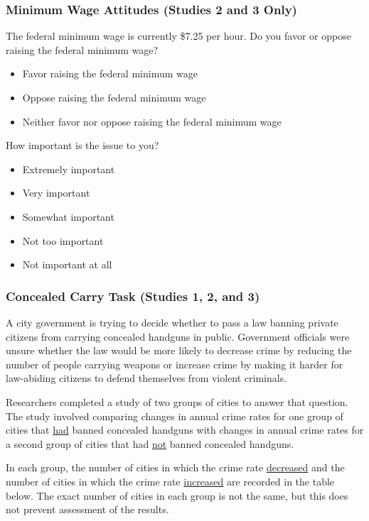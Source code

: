 \subsubsection{Minimum Wage Attitudes (Studies 2 and 3 Only)}
The federal minimum wage is currently \$7.25 per hour. Do you favor or oppose raising the federal minimum wage?
\vspace{-3mm}
\begin{itemize}
\setlength\itemsep{-.5em}
  \item Favor raising the federal minimum wage
  \item Oppose raising the federal minimum wage
  \item Neither favor nor oppose raising the federal minimum wage
\end{itemize}

How important is the issue to you?
\vspace{-3mm}
\begin{itemize}
\setlength\itemsep{-.5em}
  \item Extremely important
  \item Very important
  \item Somewhat important
  \item Not too important
  \item Not important at all
\end{itemize}


\subsubsection{Concealed Carry Task (Studies 1, 2, and 3)}
A city government is trying to decide whether to pass a law banning private citizens from carrying concealed handguns in public. Government officials were unsure whether the law would be more likely to decrease crime by reducing the number of people carrying weapons or increase crime by making it harder for law-abiding citizens to defend themselves from violent criminals.

\medskip
Researchers completed a study of two groups of cities to answer that question. The study involved comparing changes in annual crime rates for one group of cities that \uline{had} banned concealed handguns with changes in annual crime rates for a second group of cities that had \uline{not} banned concealed handguns.

\medskip
In each group, the number of cities in which the crime rate \uline{decreased} and the number of cities in which the crime rate \uline{increased} are recorded in the table below. The exact number of cities in each group is not the same, but this does not prevent assessment of the results.

